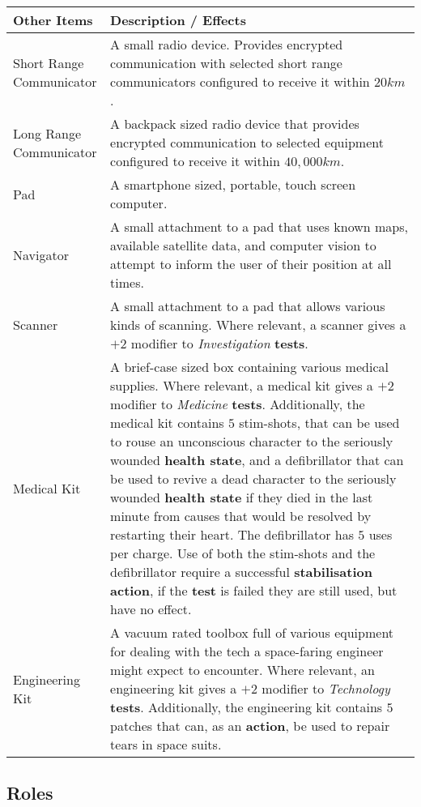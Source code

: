 \documentclass[11pt]{article}
\begin{document}
\begin{multicols}{3}
  \begin{tabularx}{\linewidth}{lX}
    Other Items & Description / Effects \\
    \hline
    \makecell[t]{Short Range\\Communicator} & A small radio device. Provides encrypted communication with selected short range communicators configured to receive it within $20km$. \\
    \makecell[t]{Long Range\\Communicator} & A backpack sized radio device that provides encrypted communication to selected equipment configured to receive it within $40,000km$. \\
    Pad & A smartphone sized, portable, touch screen computer. \\
    Navigator & A small attachment to a pad that uses known maps, available satellite data, and computer vision to attempt to inform the user of their position at all times. \\
    Scanner & A small attachment to a pad that allows various kinds of scanning. Where relevant, a scanner gives a $+2$ modifier to \textit{Investigation} \textbf{tests}. \\
    Medical Kit & A brief-case sized box containing various medical supplies. Where relevant, a medical kit gives a $+2$ modifier to \textit{Medicine} \textbf{tests}. Additionally, the medical kit contains $5$ stim-shots, that can be used to rouse an unconscious character to the seriously wounded \textbf{health state}, and a defibrillator that can be used to revive a dead character to the seriously wounded \textbf{health state} if they died in the last minute from causes that would be resolved by restarting their heart. The defibrillator has $5$ uses per charge. Use of both the stim-shots and the defibrillator require a successful \textbf{stabilisation} \textbf{action}, if the \textbf{test} is failed they are still used, but have no effect. \\
    Engineering Kit & A vacuum rated toolbox full of various equipment for dealing with the tech a space-faring engineer might expect to encounter. Where relevant, an engineering kit gives a $+2$ modifier to \textit{Technology} \textbf{tests}. Additionally, the engineering kit contains $5$ patches that can, as an \textbf{action}, be used to repair tears in space suits.
  \end{tabularx}

  \vfill\null
  \columnbreak

  \subsection*{Roles}


\end{multicols}
\end{document}
